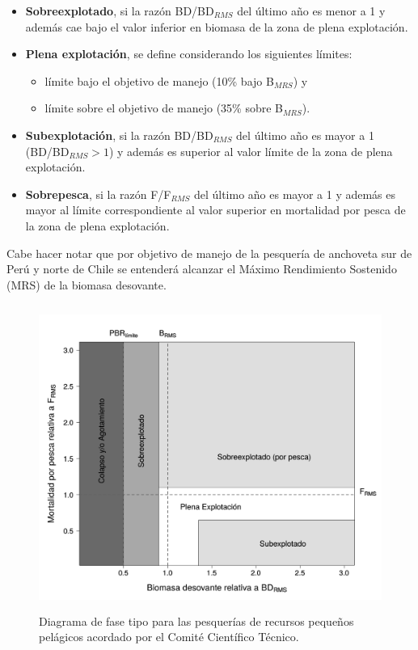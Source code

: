 \documentclass[letter,11pt]{article}
\begin{document}
\begin{itemize}
\def\labelenumi{\roman{enumi}.}
\item
  \textbf{Sobreexplotado}, si la raz\'on BD/BD$_{RMS}$ del \'ultimo a\~{n}o es
  menor a 1 y adem\'as cae bajo el valor inferior en biomasa de la zona de
  plena explotaci\'on.
\item
  \textbf{Plena explotaci\'on}, se define considerando los siguientes
  l\'imites:

  \begin{itemize}
  \def\labelenumii{(\alph{enumii})}
  
  \item
    l\'imite bajo el objetivo de manejo (10\% bajo B$_{MRS}$) y
  \item
    l\'imite sobre el objetivo de manejo (35\% sobre B$_{MRS}$).
  \end{itemize}
\item
  \textbf{Subexplotaci\'on}, si la raz\'on BD/BD$_{RMS}$ del \'ultimo a\~{n}o es
  mayor a 1 (BD/BD$_{RMS}>1$) y adem\'as es superior al valor l\'imite de
  la zona de plena explotaci\'on.
\item
  \textbf{Sobrepesca}, si la raz\'on F/F$_{RMS}$ del \'ultimo a\~{n}o es mayor
  a 1 y adem\'as es mayor al l\'imite correspondiente al valor superior en
  mortalidad por pesca de la zona de plena explotaci\'on.
\end{itemize}

Cabe hacer notar que por objetivo de manejo de la pesquer\'ia de anchoveta
sur de Per\'u y norte de Chile se entender\'a alcanzar el M\'aximo Rendimiento
Sostenido (MRS) de la biomasa desovante.

\vspace{0.5cm}
\begin{figure}[htb!]
 \centering
 \includegraphics[width=14cm,height=10cm]{Figuras/figura8.pdf}
 \caption{Diagrama de fase tipo para las pesquer\'ias de recursos peque\~{n}os pel\'agicos acordado por el Comit\'e Cient\'ifico T\'ecnico.}
 \label{Fig8}
\end{figure}
\end{document}
